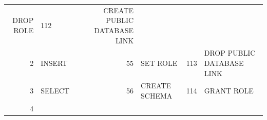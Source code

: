 \begin{appendix}
\begin{longtable}[]{@{}rl|rl|rl@{}}
\begin{minipage}[t]{0.24\columnwidth}
DROP ROLE\strut
\end{minipage} & \begin{minipage}[t]{0.06\columnwidth}\raggedright\strut
112\strut
\end{minipage} & \begin{minipage}[t]{0.24\columnwidth}\raggedright\strut
CREATE PUBLIC DATABASE LINK\strut
\end{minipage}\tabularnewline
\begin{minipage}[t]{0.06\columnwidth}\raggedright\strut
2\strut
\end{minipage} & \begin{minipage}[t]{0.19\columnwidth}\raggedright\strut
INSERT\strut
\end{minipage} & \begin{minipage}[t]{0.06\columnwidth}\raggedright\strut
55\strut
\end{minipage} & \begin{minipage}[t]{0.24\columnwidth}\raggedright\strut
SET ROLE\strut
\end{minipage} & \begin{minipage}[t]{0.06\columnwidth}\raggedright\strut
113\strut
\end{minipage} & \begin{minipage}[t]{0.24\columnwidth}\raggedright\strut
DROP PUBLIC DATABASE LINK\strut
\end{minipage}\tabularnewline
\begin{minipage}[t]{0.06\columnwidth}\raggedright\strut
3\strut
\end{minipage} & \begin{minipage}[t]{0.19\columnwidth}\raggedright\strut
SELECT\strut
\end{minipage} & \begin{minipage}[t]{0.06\columnwidth}\raggedright\strut
56\strut
\end{minipage} & \begin{minipage}[t]{0.24\columnwidth}\raggedright\strut
CREATE SCHEMA\strut
\end{minipage} & \begin{minipage}[t]{0.06\columnwidth}\raggedright\strut
114\strut
\end{minipage} & \begin{minipage}[t]{0.24\columnwidth}\raggedright\strut
GRANT ROLE\strut
\end{minipage}\tabularnewline
\begin{minipage}[t]{0.06\columnwidth}\raggedright\strut
4\strut
\end{minipage} & \begin{minipage}[t]{0.19\columnwidth}\raggedright\strut

\end{minipage}
\end{longtable}
\end{appendix}
